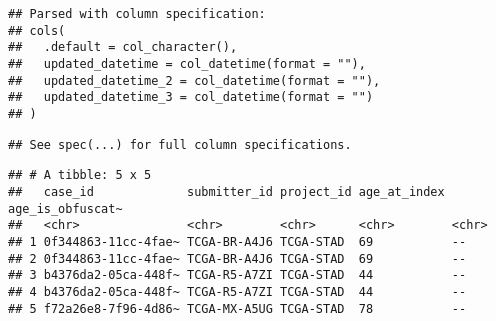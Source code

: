 \documentclass[]{article}
\newenvironment{Shaded}{\begin{snugshade}}{\end{snugshade}}
\newcommand{\KeywordTok}[1]{\textcolor[rgb]{0.13,0.29,0.53}{\textbf{#1}}}
\newcommand{\DataTypeTok}[1]{\textcolor[rgb]{0.13,0.29,0.53}{#1}}
\newcommand{\DecValTok}[1]{\textcolor[rgb]{0.00,0.00,0.81}{#1}}
\newcommand{\FloatTok}[1]{\textcolor[rgb]{0.00,0.00,0.81}{#1}}
\newcommand{\StringTok}[1]{\textcolor[rgb]{0.31,0.60,0.02}{#1}}
\newcommand{\OperatorTok}[1]{\textcolor[rgb]{0.81,0.36,0.00}{\textbf{#1}}}
\newcommand{\NormalTok}[1]{#1}
\begin{document}
\begin{verbatim}
## Parsed with column specification:
## cols(
##   .default = col_character(),
##   updated_datetime = col_datetime(format = ""),
##   updated_datetime_2 = col_datetime(format = ""),
##   updated_datetime_3 = col_datetime(format = "")
## )
\end{verbatim}

\begin{verbatim}
## See spec(...) for full column specifications.
\end{verbatim}

\begin{Shaded}
\end{Shaded}

\begin{verbatim}
## # A tibble: 5 x 5
##   case_id             submitter_id project_id age_at_index age_is_obfuscat~
##   <chr>               <chr>        <chr>      <chr>        <chr>           
## 1 0f344863-11cc-4fae~ TCGA-BR-A4J6 TCGA-STAD  69           --              
## 2 0f344863-11cc-4fae~ TCGA-BR-A4J6 TCGA-STAD  69           --              
## 3 b4376da2-05ca-448f~ TCGA-R5-A7ZI TCGA-STAD  44           --              
## 4 b4376da2-05ca-448f~ TCGA-R5-A7ZI TCGA-STAD  44           --              
## 5 f72a26e8-7f96-4d86~ TCGA-MX-A5UG TCGA-STAD  78           --
\end{verbatim}
\end{document}

